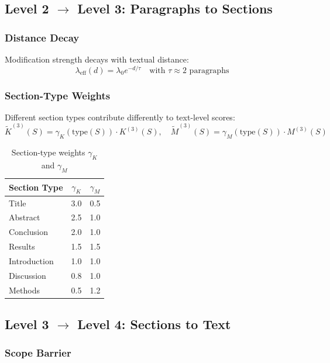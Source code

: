 \subsection{Level 2 $\rightarrow$ Level 3: Paragraphs to Sections}

\subsubsection{Distance Decay}

Modification strength decays with textual distance:
\begin{equation}
\lambda_{\text{eff}}(d) = \lambda_0 e^{-d/\tau} \quad \text{with } \tau \approx 2 \text{ paragraphs}
\end{equation}

\subsubsection{Section-Type Weights}

Different section types contribute differently to text-level scores:
\begin{equation}
\tilde{K}^{(3)}(S) = \gamma_K(\text{type}(S)) \cdot K^{(3)}(S), \quad
\tilde{M}^{(3)}(S) = \gamma_M(\text{type}(S)) \cdot M^{(3)}(S)
\end{equation}

\begin{table}[H]
\centering
\caption{Section-type weights $\gamma_K$ and $\gamma_M$}
\small
\begin{tabular}{lcc}
\toprule
\textbf{Section Type} & \textbf{$\gamma_K$} & \textbf{$\gamma_M$} \\
\midrule
Title & 3.0 & 0.5 \\
Abstract & 2.5 & 1.0 \\
Conclusion & 2.0 & 1.0 \\
Results & 1.5 & 1.5 \\
Introduction & 1.0 & 1.0 \\
Discussion & 0.8 & 1.0 \\
Methods & 0.5 & 1.2 \\
\bottomrule
\end{tabular}
\end{table}


\subsection{Level 3 $\rightarrow$ Level 4: Sections to Text}

\subsubsection{Scope Barrier}

